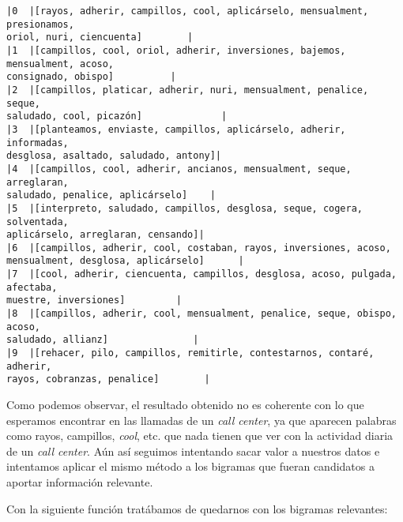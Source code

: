     \begin{Verbatim}[commandchars=\\\{\}]
|0  |[rayos, adherir, campillos, cool, aplicárselo, mensualment, presionamos,
oriol, nuri, ciencuenta]        |
|1  |[campillos, cool, oriol, adherir, inversiones, bajemos, mensualment, acoso,
consignado, obispo]          |
|2  |[campillos, platicar, adherir, nuri, mensualment, penalice, seque,
saludado, cool, picazón]              |
|3  |[planteamos, enviaste, campillos, aplicárselo, adherir, informadas,
desglosa, asaltado, saludado, antony]|
|4  |[campillos, cool, adherir, ancianos, mensualment, seque, arreglaran,
saludado, penalice, aplicárselo]    |
|5  |[interpreto, saludado, campillos, desglosa, seque, cogera, solventada,
aplicárselo, arreglaran, censando]|
|6  |[campillos, adherir, cool, costaban, rayos, inversiones, acoso,
mensualment, desglosa, aplicárselo]      |
|7  |[cool, adherir, ciencuenta, campillos, desglosa, acoso, pulgada, afectaba,
muestre, inversiones]         |
|8  |[campillos, adherir, cool, mensualment, penalice, seque, obispo, acoso,
saludado, allianz]               |
|9  |[rehacer, pilo, campillos, remitirle, contestarnos, contaré, adherir,
rayos, cobranzas, penalice]        |

    \end{Verbatim}

Como podemos observar, el resultado obtenido no es coherente con lo que esperamos encontrar en las llamadas de un \textit{call center}, ya que aparecen palabras como rayos, campillos, \textit{cool}, etc. que nada tienen que ver con la actividad diaria de un \textit{call center}. Aún así seguimos intentando sacar valor a nuestros datos e intentamos aplicar el mismo método a los bigramas que fueran candidatos a aportar información relevante. 

Con la siguiente función tratábamos de quedarnos con los bigramas relevantes: 
\vspace{0.5cm}

